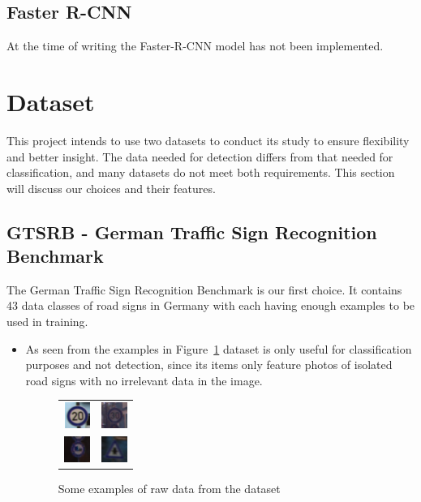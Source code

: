 \documentclass[12pt, landscape]{article}
\begin{document}
\begin{multicols}{3}
\subsection{Faster R-CNN}
At the time of writing the Faster-R-CNN model has not been implemented.

\section{Dataset}
This project intends to use two datasets to conduct its study to ensure
flexibility and better insight. The data needed for detection differs from that
needed for classification, and many datasets do not meet both requirements. This
section will discuss our choices and their features.
\subsection{GTSRB - German Traffic Sign Recognition Benchmark}
The German Traffic Sign Recognition Benchmark is our first choice. It contains
43 data classes of road signs in Germany with each having enough examples to be
used in training.

\begin{itemize}
    \item As seen from the examples in Figure~\ref{fig:dataset1examples} dataset
    is only useful for classification purposes and not detection, since its
    items only feature photos of isolated road signs with no irrelevant data in
    the image.
    \begin{figure}[H]
        \centering
        \begin{tabular}{cc}
        \includegraphics[scale=1.3]{ex1.png}&\includegraphics[scale=1.3]{ex2.png}\\
        \includegraphics[scale=1.3]{ex3.png}&\includegraphics[scale=1.3]{ex4.png}\\
        \end{tabular}
        \caption{Some examples of raw data from the dataset}
        \label{fig:dataset1examples}
    \end{figure}


\end{itemize}
\end{multicols}
\end{document}
